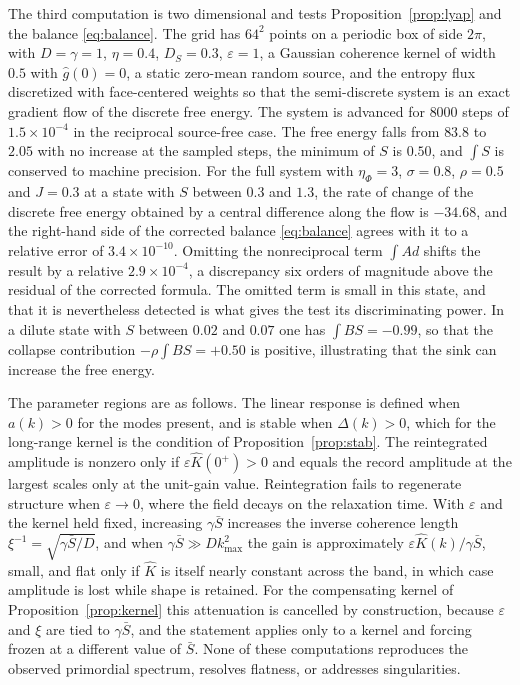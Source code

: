 \documentclass[11pt]{article}
\theoremstyle{definition}
\theoremstyle{remark}
\newcommand{\Sb}{\bar{S}}
\begin{document}
The third computation is two dimensional and tests Proposition~\ref{prop:lyap} and the balance \eqref{eq:balance}. The grid has $64^2$ points on a periodic box of side $2\pi$, with $D=\gamma=1$, $\eta=0.4$, $D_S=0.3$, $\varepsilon=1$, a Gaussian coherence kernel of width $0.5$ with $\hat g(0)=0$, a static zero-mean random source, and the entropy flux discretized with face-centered weights so that the semi-discrete system is an exact gradient flow of the discrete free energy. The system is advanced for $8000$ steps of $1.5\times10^{-4}$ in the reciprocal source-free case. The free energy falls from $83.8$ to $2.05$ with no increase at the sampled steps, the minimum of $S$ is $0.50$, and $\int S$ is conserved to machine precision. For the full system with $\eta_\Phi=3$, $\sigma=0.8$, $\rho=0.5$ and $J=0.3$ at a state with $S$ between $0.3$ and $1.3$, the rate of change of the discrete free energy obtained by a central difference along the flow is $-34.68$, and the right-hand side of the corrected balance \eqref{eq:balance} agrees with it to a relative error of $3.4\times10^{-10}$. Omitting the nonreciprocal term $\int Ad$ shifts the result by a relative $2.9\times10^{-4}$, a discrepancy six orders of magnitude above the residual of the corrected formula. The omitted term is small in this state, and that it is nevertheless detected is what gives the test its discriminating power. In a dilute state with $S$ between $0.02$ and $0.07$ one has $\int BS=-0.99$, so that the collapse contribution $-\rho\int BS=+0.50$ is positive, illustrating that the sink can increase the free energy.

The parameter regions are as follows. The linear response is defined when $a(k)>0$ for the modes present, and is stable when $\Delta(k)>0$, which for the long-range kernel is the condition of Proposition~\ref{prop:stab}. The reintegrated amplitude is nonzero only if $\varepsilon\hat K(0^+)>0$ and equals the record amplitude at the largest scales only at the unit-gain value. Reintegration fails to regenerate structure when $\varepsilon\to0$, where the field decays on the relaxation time. With $\varepsilon$ and the kernel held fixed, increasing $\gamma\Sb$ increases the inverse coherence length $\xi^{-1}=\sqrt{\gamma\Sb/D}$, and when $\gamma\Sb\gg Dk_{\max}^2$ the gain is approximately $\varepsilon\hat K(k)/\gamma\Sb$, small, and flat only if $\hat K$ is itself nearly constant across the band, in which case amplitude is lost while shape is retained. For the compensating kernel of Proposition~\ref{prop:kernel} this attenuation is cancelled by construction, because $\varepsilon$ and $\xi$ are tied to $\gamma\Sb$, and the statement applies only to a kernel and forcing frozen at a different value of $\Sb$. None of these computations reproduces the observed primordial spectrum, resolves flatness, or addresses singularities.
\end{document}
